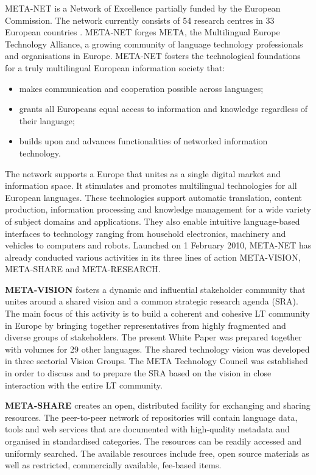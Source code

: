 \begin{multicols}{2}

META-NET is a Network of Excellence partially funded by the European Commission. The network currently consists of 54 research centres in 33 European countries \cite{art10}. META-NET forges META, the Multilingual Europe Technology Alliance, a growing community of language technology professionals and organisations in Europe. META-NET fosters the technological foundations for a truly multilingual European information society that:

\begin{itemize}
\item makes communication and cooperation possible across languages;
\item grants all Europeans equal access to information and knowledge regardless of their language;
\item builds upon and advances functionalities of networked information technology.
\end{itemize}

The network supports a Europe that unites as a single digital market and information space. It stimulates and promotes multilingual technologies for all European languages. These technologies support automatic translation, content production, information processing and knowledge management for a wide variety of subject domains and applications. They also enable intuitive language-based interfaces to technology ranging from household electronics, machinery and vehicles to computers and robots.
Launched on 1 February 2010, META-NET has already conducted various activities in its three lines of action META-VISION, META-SHARE and META-RESEARCH.

\textbf{META-VISION} fosters a dynamic and influential stakeholder community that unites around a shared vision and a common strategic research agenda (SRA). The main focus of this activity is to build a coherent and cohesive LT community in Europe by bringing together representatives from highly fragmented and diverse groups of stakeholders. The present White Paper was prepared together with volumes for 29 other languages. The shared technology vision was developed in three sectorial Vision Groups. The META Technology Council was established in order to discuss and to prepare the SRA based on the vision in close interaction with the entire LT community.

\textbf{META-SHARE} creates an open, distributed facility for exchanging and sharing resources. The peer-to-peer network of repositories will contain language data, tools and web services that are documented with high-quality metadata and organised in standardised categories. The resources can be readily accessed and uniformly searched. The available resources include free, open source materials as well as restricted, commercially available, fee-based items.


\end{multicols}
